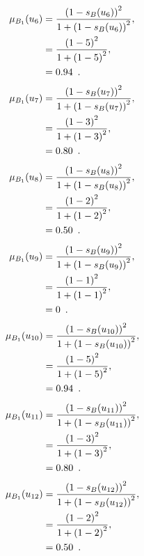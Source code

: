 \documentclass[a4paper,openany]{book}
\begin{document}
				\begin{align}
					\mu_{B_1}(u_6) &= \frac{\left(1-s_B(u_6)\right)^2}{1 + \left(1-s_B(u_6)\right)^2} ,\\
					&= \frac{\left(1-5\right)^2}{1 + \left(1-5\right)^2} \notag ,\\
					&= 0.94 \enspace. \notag
				\end{align}
				\begin{align}
					\mu_{B_1}(u_7) &= \frac{\left(1-s_B(u_7)\right)^2}{1 + \left(1-s_B(u_7)\right)^2} ,\\
					&= \frac{\left(1-3\right)^2}{1 + \left(1-3\right)^2} \notag ,\\
					&= 0.80 \enspace. \notag
				\end{align}
				\begin{align}
					\mu_{B_1}(u_8) &= \frac{\left(1-s_B(u_8)\right)^2}{1 + \left(1-s_B(u_8)\right)^2} ,\\
					&= \frac{\left(1-2\right)^2}{1 + \left(1-2\right)^2} \notag ,\\
					&= 0.50 \enspace. \notag
				\end{align}
				\begin{align}
					\mu_{B_1}(u_9) &= \frac{\left(1-s_B(u_9)\right)^2}{1 + \left(1-s_B(u_9)\right)^2} ,\\
					&= \frac{\left(1-1\right)^2}{1 + \left(1-1\right)^2} \notag ,\\
					&= 0 \enspace. \notag
				\end{align}
				\begin{align}
					\mu_{B_1}(u_{10}) &= \frac{\left(1-s_B(u_{10})\right)^2}{1 + \left(1-s_B(u_{10})\right)^2} ,\\
					&= \frac{\left(1-5\right)^2}{1 + \left(1-5\right)^2} \notag ,\\
					&= 0.94 \enspace. \notag
				\end{align}
				\begin{align}
					\mu_{B_1}(u_{11}) &= \frac{\left(1-s_B(u_{11})\right)^2}{1 + \left(1-s_B(u_{11})\right)^2} ,\\
					&= \frac{\left(1-3\right)^2}{1 + \left(1-3\right)^2} \notag ,\\
					&= 0.80 \enspace. \notag
				\end{align}
				\begin{align}
					\mu_{B_1}(u_{12}) &= \frac{\left(1-s_B(u_{12})\right)^2}{1 + \left(1-s_B(u_{12})\right)^2} ,\\
					&= \frac{\left(1-2\right)^2}{1 + \left(1-2\right)^2} \notag ,\\
					&= 0.50 \enspace. \notag
				\end{align}
\end{document}
